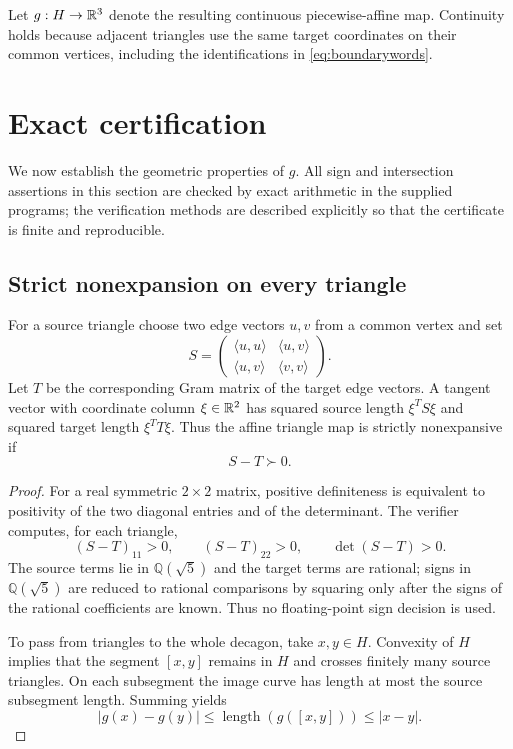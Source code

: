 Let $g:H\to\mathbb{R}^3$ denote the resulting continuous piecewise-affine map.  Continuity holds because adjacent triangles use the same target coordinates on their common vertices, including the identifications in \eqref{eq:boundarywords}.

\section{Exact certification}\label{sec:certificate}
We now establish the geometric properties of $g$.  All sign and intersection assertions in this section are checked by exact arithmetic in the supplied programs; the verification methods are described explicitly so that the certificate is finite and reproducible.

\subsection{Strict nonexpansion on every triangle}
For a source triangle choose two edge vectors $u,v$ from a common vertex and set
\[
S=\begin{pmatrix}
\langle u,u\rangle & \langle u,v\rangle\\
\langle u,v\rangle & \langle v,v\rangle
\end{pmatrix}.
\]
Let $T$ be the corresponding Gram matrix of the target edge vectors.  A tangent vector with coordinate column $\xi\in\mathbb{R}^2$ has squared source length $\xi^TS\xi$ and squared target length $\xi^TT\xi$.  Thus the affine triangle map is strictly nonexpansive if
\[
S-T\succ0.
\]


\begin{proof}
For a real symmetric $2\times2$ matrix, positive definiteness is equivalent to positivity of the two diagonal entries and of the determinant.  The verifier computes, for each triangle,
\[
(S-T)_{11}>0,\qquad (S-T)_{22}>0,\qquad \det(S-T)>0.
\]
The source terms lie in $\mathbb Q(\sqrt5)$ and the target terms are rational; signs in $\mathbb Q(\sqrt5)$ are reduced to rational comparisons by squaring only after the signs of the rational coefficients are known.  Thus no floating-point sign decision is used.

To pass from triangles to the whole decagon, take $x,y\in H$.  Convexity of $H$ implies that the segment $[x,y]$ remains in $H$ and crosses finitely many source triangles.  On each subsegment the image curve has length at most the source subsegment length.  Summing yields
\[
|g(x)-g(y)|\le \operatorname{length}(g([x,y]))\le |x-y|.
\]
\end{proof}

